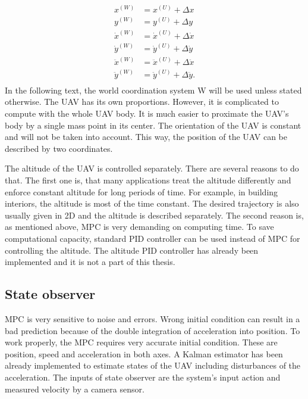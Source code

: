 \documentclass[a4paper,11pt,titlepage]{article}
\begin{document}
\begin{equation}
\label{eq:coordinate_transform}
\begin{split}
x^{(W)} &= x^{(U)}+\Delta x	\\
y^{(W)} &= y^{(U)}+\Delta y	\\
\dot{x}^{(W)} &= \dot{x}^{(U)}+\Delta \dot{x}	\\
\dot{y}^{(W)} &= \dot{y}^{(U)}+\Delta \dot{y}	\\
\ddot{x}^{(W)} &= \ddot{x}^{(U)}+\Delta \ddot{x}	\\
\ddot{y}^{(W)} &= \ddot{y}^{(U)}+\Delta \ddot{y}.	\\
\end{split}
\end{equation}
In the following text, the world coordination system W will be used unless stated otherwise. The UAV has its own proportions. However, it is complicated to compute with the whole UAV body. It is much easier to proximate the UAV's body by a single mass point in its center. The orientation of the UAV is constant and will not be taken into account. This way, the position of the UAV can be described by two coordinates. 

The altitude of the UAV is controlled separately. There are several reasons to do that. The first one is, that many applications treat the altitude differently and enforce constant altitude for long periods of time. For example, in building interiors, the altitude is most of the time constant. The desired trajectory is also usually given in 2D and the altitude is described separately. The second reason is, as mentioned above, MPC is very demanding on computing time. To save computational capacity, standard PID controller can be used instead of MPC for controlling the altitude. The altitude PID controller has already been implemented \cite{tomas} and it is not a part of this thesis. 

\subsection{State observer}
\label{sec:state_observer}
MPC is very sensitive to noise and errors. Wrong initial condition can result in a bad prediction because of the double integration of acceleration into position. To work properly, the MPC requires very accurate initial condition. These are position, speed and acceleration in both axes. A Kalman estimator has been already implemented \cite{tomas} to estimate states of the UAV including disturbances of the acceleration. The inputs of state observer are the system's input action and measured velocity by a camera sensor.
\end{document}
